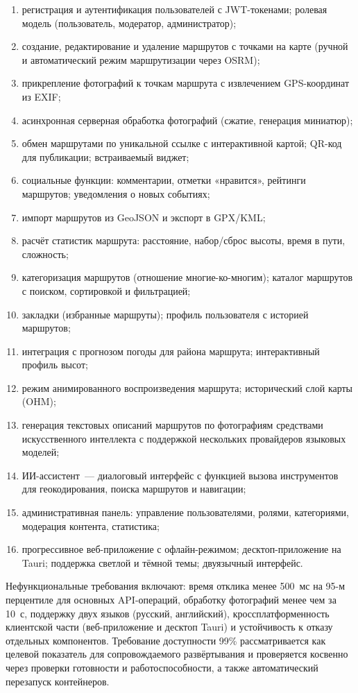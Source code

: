 \begin{enumerate}
  \item регистрация и аутентификация пользователей с JWT-токенами; ролевая модель (пользователь, модератор, администратор);
  \item создание, редактирование и удаление маршрутов с точками на карте (ручной и автоматический режим маршрутизации через OSRM);
  \item прикрепление фотографий к точкам маршрута с извлечением GPS-координат из EXIF;
  \item асинхронная серверная обработка фотографий (сжатие, генерация миниатюр);
  \item обмен маршрутами по уникальной ссылке с интерактивной картой; QR-код для публикации; встраиваемый виджет;
  \item социальные функции: комментарии, отметки «нравится», рейтинги маршрутов; уведомления о новых событиях;
  \item импорт маршрутов из GeoJSON и экспорт в GPX/KML;
  \item расчёт статистик маршрута: расстояние, набор/сброс высоты, время в пути, сложность;
  \item категоризация маршрутов (отношение многие-ко-многим); каталог маршрутов с поиском, сортировкой и фильтрацией;
  \item закладки (избранные маршруты); профиль пользователя с историей маршрутов;
  \item интеграция с прогнозом погоды для района маршрута; интерактивный профиль высот;
  \item режим анимированного воспроизведения маршрута; исторический слой карты (OHM);
  \item генерация текстовых описаний маршрутов по фотографиям средствами искусственного интеллекта с поддержкой нескольких провайдеров языковых моделей;
  \item ИИ-ассистент~--- диалоговый интерфейс с функцией вызова инструментов для геокодирования, поиска маршрутов и навигации;
  \item административная панель: управление пользователями, ролями, категориями, модерация контента, статистика;
  \item прогрессивное веб-приложение с офлайн-режимом; десктоп-приложение на Tauri; поддержка светлой и тёмной темы; двуязычный интерфейс.
\end{enumerate}

Нефункциональные требования включают: время отклика менее 500~мс на 95-м
перцентиле для основных API-операций, обработку фотографий менее чем за 10~с,
поддержку двух языков (русский, английский), кроссплатформенность клиентской
части (веб-приложение и десктоп Tauri) и устойчивость к отказу отдельных
компонентов. Требование доступности 99\% рассматривается как целевой показатель
для сопровождаемого развёртывания и проверяется косвенно через проверки
готовности и работоспособности, а также автоматический перезапуск контейнеров.

